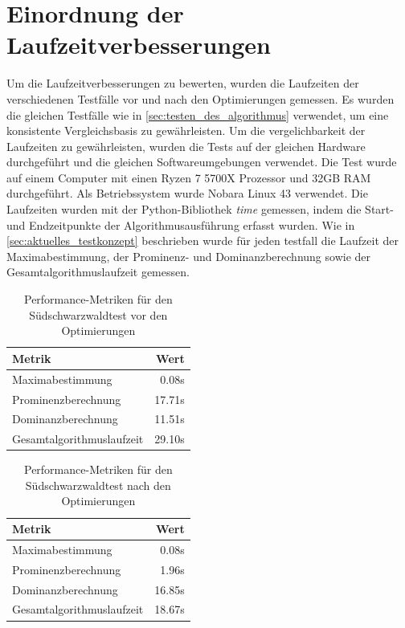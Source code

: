\section{Einordnung der Laufzeitverbesserungen} \label{sec:laufzeitverbesserung_optimierung}
Um die Laufzeitverbesserungen zu bewerten, wurden die Laufzeiten der verschiedenen Testfälle vor und nach den Optimierungen gemessen. Es wurden die gleichen Testfälle wie in \ref{sec:testen_des_algorithmus} verwendet, um eine konsistente Vergleichsbasis zu gewährleisten. Um die vergelichbarkeit der Laufzeiten zu gewährleisten, wurden die Tests auf der gleichen Hardware durchgeführt und die gleichen Softwareumgebungen verwendet. Die Test wurde auf einem Computer mit einen Ryzen 7 5700X Prozessor und 32GB RAM durchgeführt. Als Betriebssystem wurde Nobara Linux 43 verwendet. Die Laufzeiten wurden mit der Python-Bibliothek \textit{time} gemessen, indem die Start- und Endzeitpunkte der Algorithmusausführung erfasst wurden. Wie in \ref{sec:aktuelles_testkonzept} beschrieben wurde für jeden testfall die Laufzeit der Maximabestimmung, der Prominenz- und Dominanzberechnung sowie der Gesamtalgorithmuslaufzeit gemessen. 

\begin{table}[htbp]
\centering
\caption{Performance-Metriken für den Südschwarzwaldtest vor den Optimierungen}
\label{tab:performance_blackforrest_before}
\begin{tabular}{|l|r|}
\hline
Metrik & Wert \\
\hline
Maximabestimmung & 0.08s \\
\hline
Prominenzberechnung & 17.71s \\
\hline
Dominanzberechnung & 11.51s \\
\hline
Gesamtalgorithmuslaufzeit & 29.10s \\
\hline
\end{tabular}
\end{table}

\begin{table}[htbp]
\centering
\caption{Performance-Metriken für den Südschwarzwaldtest nach den Optimierungen}
\label{tab:performance_blackforrest_after}
\begin{tabular}{|l|r|}
\hline
Metrik & Wert \\
\hline
Maximabestimmung & 0.08s \\
\hline
Prominenzberechnung & 1.96s \\
\hline
Dominanzberechnung & 16.85s \\
\hline
Gesamtalgorithmuslaufzeit & 18.67s \\
\hline
\end{tabular}
\end{table}

